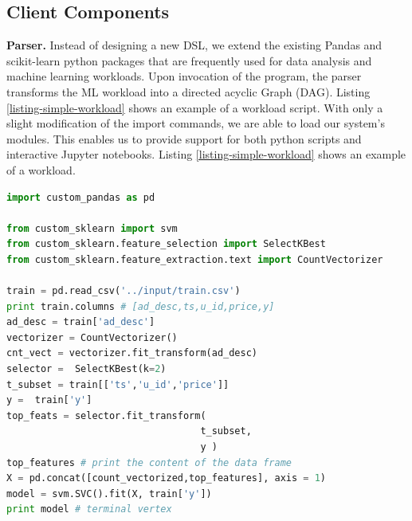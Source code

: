 \subsection{Client Components}
\textbf{Parser. }
Instead of designing a new DSL, we extend the existing Pandas and scikit-learn \cite{sklearn_api} python packages that are frequently used for data analysis and machine learning workloads.
Upon invocation of the program, the parser transforms the ML workload into a directed acyclic Graph (DAG).
Listing \ref{listing-simple-workload} shows an example of a workload script.
With only a slight modification of the import commands, we are able to load our system's modules.
This enables us to provide support for both python scripts and interactive Jupyter notebooks.
Listing \ref{listing-simple-workload} shows an example of a workload.
\begin{lstlisting}[language=Python, caption=Example script,captionpos=b,label = {listing-simple-workload}]
import custom_pandas as pd

from custom_sklearn import svm
from custom_sklearn.feature_selection import SelectKBest
from custom_sklearn.feature_extraction.text import CountVectorizer

train = pd.read_csv('../input/train.csv') 
print train.columns # [ad_desc,ts,u_id,price,y]
ad_desc = train['ad_desc']
vectorizer = CountVectorizer()
cnt_vect = vectorizer.fit_transform(ad_desc)
selector =  SelectKBest(k=2)
t_subset = train[['ts','u_id','price']]
y =  train['y']
top_feats = selector.fit_transform(
                                  t_subset,  
                                  y )
top_features # print the content of the data frame			     
X = pd.concat([count_vectorized,top_features], axis = 1)
model = svm.SVC().fit(X, train['y'])
print model # terminal vertex
\end{lstlisting}

